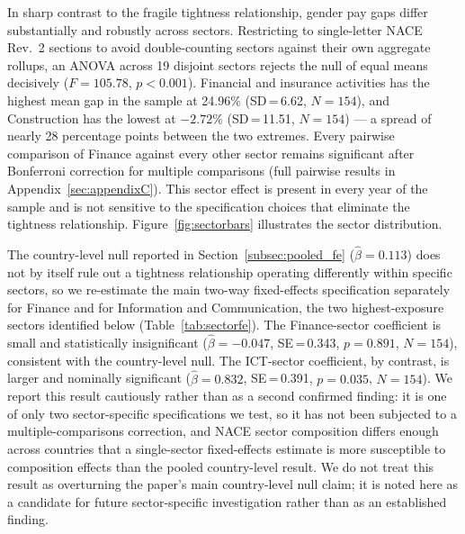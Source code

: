 \documentclass[12pt,a4paper]{article}
\begin{document}
In sharp contrast to the fragile tightness relationship, gender pay gaps differ
substantially and robustly across sectors.  Restricting to single-letter NACE
Rev.~2 sections to avoid double-counting sectors against their own aggregate
rollups, an ANOVA across 19 disjoint sectors rejects the null of equal means
decisively ($F=105.78$, $p<0.001$).  Financial and insurance activities has the
highest mean gap in the sample at 24.96\% (SD\,=\,6.62, $N=154$), and
Construction has the lowest at $-2.72$\% (SD\,=\,11.51, $N=154$) --- a spread
of nearly 28 percentage points between the two extremes.  Every pairwise
comparison of Finance against every other sector remains significant after
Bonferroni correction for multiple comparisons (full pairwise results in
Appendix~\ref{sec:appendixC}).  This sector effect is present
in every year of the sample and is not sensitive to the specification choices
that eliminate the tightness relationship.  Figure~\ref{fig:sectorbars}
illustrates the sector distribution.

The country-level null reported in Section~\ref{subsec:pooled_fe}
($\hat{\beta}=0.113$) does not by itself rule out a tightness relationship
operating differently within specific sectors, so we re-estimate the main
two-way fixed-effects specification separately for Finance and for Information
and Communication, the two highest-exposure sectors identified below
(Table~\ref{tab:sectorfe}).  The Finance-sector coefficient is small and
statistically insignificant ($\hat{\beta}=-0.047$, SE\,=\,0.343, $p=0.891$,
$N=154$), consistent with the country-level null.  The ICT-sector coefficient,
by contrast, is larger and nominally significant ($\hat{\beta}=0.832$,
SE\,=\,0.391, $p=0.035$, $N=154$).  We report this result cautiously rather
than as a second confirmed finding: it is one of only two sector-specific
specifications we test, so it has not been subjected to a multiple-comparisons
correction, and NACE sector composition differs enough across countries that a
single-sector fixed-effects estimate is more susceptible to composition effects
than the pooled country-level result.  We do not treat this result as overturning
the paper's main country-level null claim; it is noted here as a candidate for
future sector-specific investigation rather than as an established finding.
\end{document}
